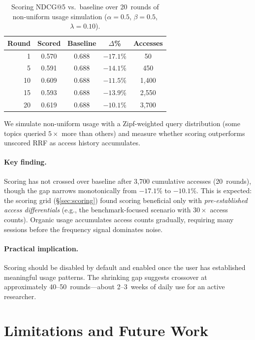 \documentclass[11pt,a4paper]{article}
\begin{document}
\begin{table}[t]
  \centering
  \caption{Scoring NDCG@5 vs.\ baseline over 20~rounds of non-uniform
    usage simulation ($\alpha=0.5$, $\beta=0.5$, $\lambda=0.10$).}
  \label{tab:coldstart}
  \begin{tabular}{rcccc}
    \toprule
    Round & Scored & Baseline & $\Delta$\% & Accesses \\
    \midrule
    1  & 0.570 & 0.688 & $-17.1$\% & 50 \\
    5  & 0.591 & 0.688 & $-14.1$\% & 450 \\
    10 & 0.609 & 0.688 & $-11.5$\% & 1{,}400 \\
    15 & 0.593 & 0.688 & $-13.9$\% & 2{,}550 \\
    20 & 0.619 & 0.688 & $-10.1$\% & 3{,}700 \\
    \bottomrule
  \end{tabular}
\end{table}

We simulate non-uniform usage with a Zipf-weighted query distribution
(some topics queried $5\times$ more than others) and measure whether
scoring outperforms unscored RRF as access history accumulates.

\paragraph{Key finding.}  Scoring has not crossed over baseline after
3{,}700 cumulative accesses (20~rounds), though the gap narrows
monotonically from $-17.1$\% to $-10.1$\%.  This is expected: the
scoring grid (\S\ref{sec:scoring}) found scoring beneficial only with
\emph{pre-established access differentials} (e.g., the
benchmark-focused scenario with $30\times$ access counts).  Organic
usage accumulates access counts gradually, requiring many sessions
before the frequency signal dominates noise.

\paragraph{Practical implication.}  Scoring should be disabled by
default and enabled once the user has established meaningful usage
patterns.  The shrinking gap suggests crossover at approximately
40--50~rounds---about 2--3~weeks of daily use for an active researcher.


\section{Limitations and Future Work}
\label{sec:limitations}
\end{document}
